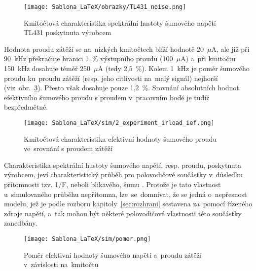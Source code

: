 \documentclass[12pt]{CLASS/protokol}
\begin{document}
        \begin{figure}[h]
            \centering
            \texttt{[image: Sablona\_LaTeX/obrazky/TL431\_noise.png]}
            \caption{Kmitočtová charakteristika spektrální hustoty šumového napětí TL431 poskytnuta výrobcem \cite{TI_TL431_datasheet}}
            \label{fig:TL431_noise}
        \end{figure}
        \clearpage
        \newpage
        \par
        Hodnota proudu zátěží se na~nízkých kmitočtech blíží hodnotě 20~$\mu$A, ale již při 90~kHz překračuje hranici 1~\% výstupního proudu (100~$\mu$A) a~při kmitočtu 150~kHz dosahuje téměř 250~$\mu$A (tedy 2,5~\%). Kolem 1~kHz je poměr šumového proudu ku~proudu zátěží (resp. jeho citlivosti na~malý signál) nejhorší (viz~obr.~\ref{fig:pomer}). Přesto však dosahuje pouze 1,2~\%. Srovnání absolutních hodnot efektivního šumového proudu s proudem v~pracovním bodě je tudíž bezpředmětné.

        \vspace{3 cm}
        
        \begin{figure}[h]
            \centering
            \texttt{[image: Sablona\_LaTeX/sim/2\_experiment\_irload\_ief.png]}
            \caption{Kmitočtová charakteristika efektivní hodnoty šumového proudu ve~srovnání s proudem zátěží \cite{pspice}}
            \label{fig:2_b}
        \end{figure}

        \newpage
        \par
        Charakteristika spektrální hustoty šumového napětí, resp. proudu, poskytnuta výrobcem, jeví charakteristický průběh pro polovodičové součástky v~důsledku přítomnosti tzv. 1/F, neboli blikavého, šumu \cite{prednasky}. Protože je tato vlastnost u~simulovaného průběhu nepřítomna, lze~se~domnívat, že se jedná o~nepřesnost modelu, jež je podle rozboru kapitoly~\ref{sec:rozhrani} sestavena za~pomocí řízeného zdroje napětí, a~tak mohou být některé polovodičové vlastnosti této součástky zanedbány.

        \vspace{2 cm}
        
        \begin{figure}[h]
            \centering
            \texttt{[image: Sablona\_LaTeX/sim/pomer.png]}
            \caption{Poměr efektivní hodnoty šumového napětí a~proudu zátěží v~závislosti na~kmitočtu \cite{pspice}}
            \label{fig:pomer}
        \end{figure}
    \clearpage
    \newpage
\end{document}
